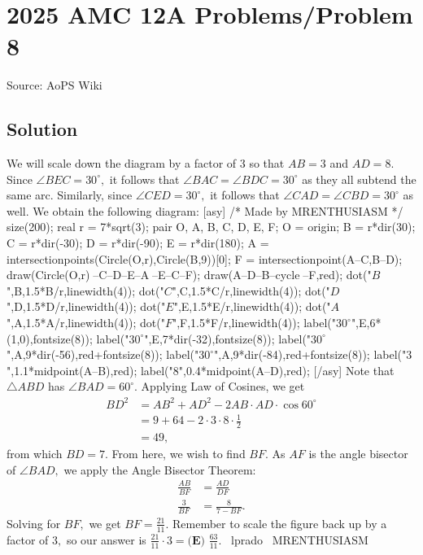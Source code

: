 \documentclass[12pt]{article}
\begin{document}
\section*{{2025 AMC 12A Problems/Problem 8}}
Source: AoPS Wiki

\subsection*{Solution}
We will scale down the diagram by a factor of $3$ so that $AB = 3$ and $AD = 8.$ Since $\angle BEC = 30^{\circ},$ it follows that $\angle BAC = \angle BDC = 30^{\circ}$ as they all subtend the same arc. Similarly, since $\angle CED = 30^{\circ},$ it follows that $\angle CAD = \angle CBD = 30^{\circ}$ as well. We obtain the following diagram: [asy] /* Made by MRENTHUSIASM */ size(200); real r = 7*sqrt(3); pair O, A, B, C, D, E, F; O = origin; B = r*dir(30); C = r*dir(-30); D = r*dir(-90); E = r*dir(180); A = intersectionpoints(Circle(O,r),Circle(B,9))[0]; F = intersectionpoint(A--C,B--D); draw(Circle(O,r)^^B--C--D--E--A^^B--E--C--F); draw(A--D--B--cycle^^A--F,red); dot("$B$",B,1.5*B/r,linewidth(4)); dot("$C$",C,1.5*C/r,linewidth(4)); dot("$D$",D,1.5*D/r,linewidth(4)); dot("$E$",E,1.5*E/r,linewidth(4)); dot("$A$",A,1.5*A/r,linewidth(4)); dot("$F$",F,1.5*F/r,linewidth(4)); label("$30^{\circ}$",E,6*(1,0),fontsize(8)); label("$30^{\circ}$",E,7*dir(-32),fontsize(8)); label("$30^{\circ}$",A,9*dir(-56),red+fontsize(8)); label("$30^{\circ}$",A,9*dir(-84),red+fontsize(8)); label("$3$",1.1*midpoint(A--B),red); label("$8$",0.4*midpoint(A--D),red); [/asy] Note that $\triangle ABD$ has $\angle BAD = 60^{\circ}.$ Applying Law of Cosines, we get \begin{align*} BD^2 &= AB^2+AD^2-2AB\cdot AD \cdot\cos{60^{\circ}} \\ &= 9 + 64 - 2 \cdot 3 \cdot 8 \cdot \frac{1}{2} \\ &= 49, \end{align*} from which $BD = 7.$ From here, we wish to find $BF.$ As $AF$ is the angle bisector of $\angle BAD,$ we apply the Angle Bisector Theorem: \begin{align*} \frac{AB}{BF} &= \frac{AD}{DF} \\ \frac{3}{BF} &= \frac{8}{7-BF}. \end{align*} Solving for $BF,$ we get $BF = \frac{21}{11}.$ Remember to scale the figure back up by a factor of $3,$ so our answer is $\frac{21}{11}\cdot 3 = \boxed{\textbf{(E) } \frac{63}{11}}.$ ~lprado ~MRENTHUSIASM
\end{document}
